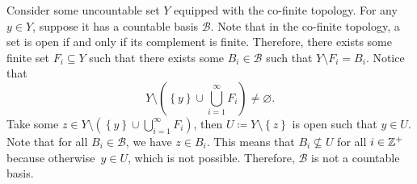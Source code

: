 \documentclass[math]{amznotes}
\theoremstyle{remark}
\begin{document}
Consider some uncountable set $Y$ equipped with the co-finite topology. For any $y \in Y$, suppose it has a countable basis $\mathcal{B}$. Note that in the co-finite topology, a set is open if and only if its complement is finite. Therefore, there exists some finite set $F_i \subseteq Y$ such that there exists some $B_i \in \mathcal{B}$ such that $Y \setminus F_i = B_i$. Notice that 
\begin{equation*}
    Y \setminus \left(\left\{y\right\} \cup \bigcup_{i = 1}^{\infty}F_i\right) \neq \varnothing.
\end{equation*}
Take some $z \in Y \setminus \left(\left\{y\right\} \cup \bigcup_{i = 1}^{\infty}F_i\right)$, then $U \coloneqq Y \setminus \left\{z\right\}$ is open such that $y \in U$. Note that for all $B_i \in \mathcal{B}$, we have $z \in B_i$. This means that $B_i \not\subseteq U$ for all $i \in \mathbb{Z}^+$ because otherwise~$y \in U$, which is not possible. Therefore, $\mathcal{B}$ is not a countable basis.
\end{document}
